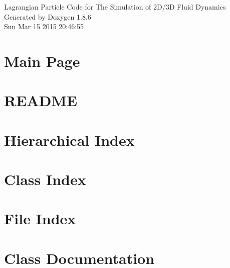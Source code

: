 \documentclass[twoside]{book}
\newcommand{\clearemptydoublepage}{%
  \newpage{\pagestyle{empty}\cleardoublepage}%
}
\begin{document}
\hypersetup{pageanchor=false}
\begin{titlepage}
\vspace*{7cm}
\begin{center}%
{\Large Lagrangian Particle Code for The Simulation of 2\-D/3\-D Fluid Dynamics }\\
\vspace*{1cm}
{\large Generated by Doxygen 1.8.6}\\
\vspace*{0.5cm}
{\small Sun Mar 15 2015 20:46:55}\\
\end{center}
\end{titlepage}
\clearemptydoublepage
\tableofcontents
\clearemptydoublepage
{}
\hypersetup{pageanchor=true}

\chapter{Main Page}
\label{index}\hypertarget{index}{}
\chapter{R\-E\-A\-D\-M\-E}
\label{md_README}
\hypertarget{md_README}{}

\chapter{Hierarchical Index}

\chapter{Class Index}

\chapter{File Index}

\chapter{Class Documentation}







































\end{document}

